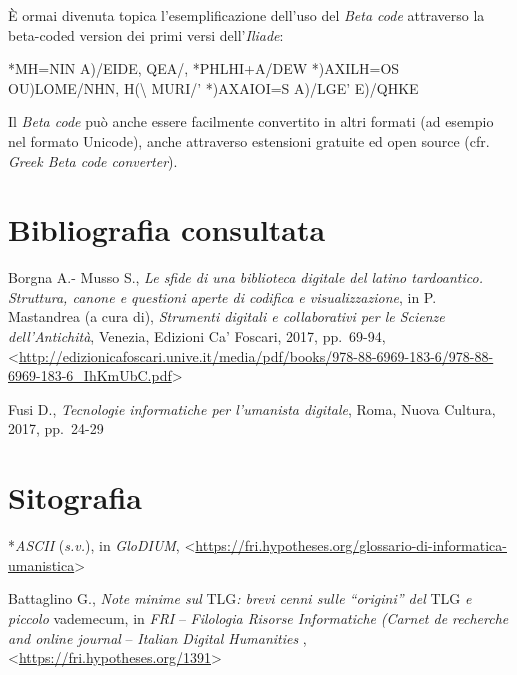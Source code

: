 \documentclass[
  b5paper,
  twoside,
  11pt,
  chapterprefix=false,
  bibliography=totocnumbered,
  listof=flat]{scrbook}
\begin{document}
È ormai divenuta topica l'esemplificazione dell'uso del \emph{Beta code}
attraverso la beta-coded version dei primi versi dell'\emph{Iliade}:

*MH=NIN A)/EIDE, QEA/, *PHLHI+A/DEW *)AXILH=OS\\
OU)LOME/NHN, H(\textbackslash{} MURI/' *)AXAIOI=S A)/LGE' E)/QHKE

Il \emph{Beta code} può anche essere facilmente convertito in altri formati
(ad esempio nel formato Unicode), anche attraverso estensioni gratuite
ed open source (cfr. \emph{Greek Beta code converter}).

\hypertarget{bibliografia-consultata-2}{%
\section*{Bibliografia consultata}\label{bibliografia-consultata-2}}

Borgna A.- Musso S., \emph{Le sfide di una biblioteca digitale del latino
tardoantico. Struttura, canone e questioni aperte di codifica e
visualizzazione}, in P. Mastandrea (a cura di), \emph{Strumenti digitali e
collaborativi per le Scienze dell'Antichità}, Venezia, Edizioni Ca'
Foscari, 2017, pp.~69-94,
\textless{}\href{http://edizionicafoscari.unive.it/media/pdf/books/978-88-6969-183-6/978-88-6969-183-6_IhKmUbC.pdf}{{http://edizionicafoscari.unive.it/media/pdf/books/978-88-6969-183-6/978-88-6969-183-6\_IhKmUbC.pdf}}\textgreater{}

Fusi D., \emph{Tecnologie informatiche per l'umanista digitale}, Roma, Nuova
Cultura, 2017, pp.~24-29

\hypertarget{sitografia-1}{%
\section*{Sitografia}\label{sitografia-1}}

*\emph{ASCII} (\emph{s.v.}), in \emph{GloDIUM},
\textless{}\href{https://fri.hypotheses.org/glossario-di-informatica-umanistica}{{https://fri.hypotheses.org/glossario-di-informatica-umanistica}}\textgreater{}

Battaglino G., \emph{Note minime sul} TLG\emph{: brevi cenni sulle \enquote{origini} del}
TLG \emph{e piccolo} vademecum, in \emph{FRI} -- \emph{Filologia Risorse Informatiche}
\emph{(Carnet de recherche and online journal} -- \emph{Italian Digital
Humanities} ,
\textless{}\href{https://fri.hypotheses.org/1391}{{https://fri.hypotheses.org/1391}}\textgreater{}
\end{document}
